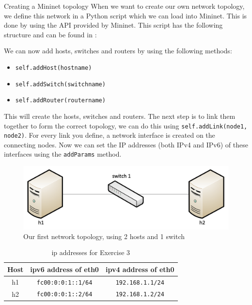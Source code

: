 \begin{exercise}{Creating a Mininet topology}
When we want to create our own network topology, we define this network in a Python script which we can load into Mininet. This is done by using the API provided by Mininet. This script has the following structure and can be found in :



We can now add hosts, switches and routers by using the following methods:
\begin{itemize}
	\item \texttt{self.addHost(hostname)}
	\item \texttt{self.addSwitch(switchname)}
	\item \texttt{self.addRouter(routername)}
\end{itemize}

This will create the hosts, switches and routers. The next step is to link them together to form the correct topology, we can do this using \texttt{self.addLink(node1, node2)}. For every link you define, a network interface is created on the connecting nodes. Now we can set the IP addresses (both IPv4 and IPv6) of these interfaces using the \texttt{addParams} method.

\begin{figure}[ht]
	\centering
	\includegraphics[width=0.8\linewidth]{graphics/Lab0-Mininet1.png}	
	\caption{Our first network topology, using 2 hosts and 1 switch}
	\label{fig:wireshark-http}
\end{figure}
\newpage

\begin{table}[ht]
	\centering
	\begin{tabular}{| c | c | c |}	
		\hline
		\textbf{Host} & \textbf{\ac{ipv6} address of eth0}  & \textbf{\ac{ipv4} address of eth0} \\ \hline
		h1 & \texttt{fc00:0:0:1::1/64} & \texttt{192.168.1.1/24} \\ 
		h2 & \texttt{fc00:0:0:1::2/64} & \texttt{192.168.1.2/24} \\
		\hline
	\end{tabular}
	\caption{\ac{ip} addresses for Exercise 3}
	\label{tab:mininet1}
\end{table}


\end{exercise}
